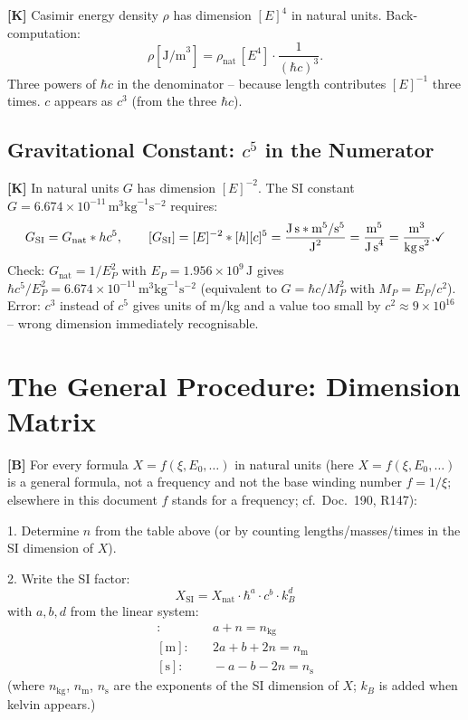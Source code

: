 \textbf{[K]} Casimir energy density $\rho$ has dimension $[E]^4$ in natural
units. Back-computation:
\[
  \rho[\text{J/m}^3]
  = \rho_\text{nat}\,[E^4]\cdot\frac{1}{(\hbar c)^3}.
\]
Three powers of $\hbar c$ in the denominator -- because length contributes
$[E]^{-1}$ three times. $c$ appears as $c^3$ (from the three $\hbar c$).

\subsection{Gravitational Constant: $c^5$ in the Numerator}

\textbf{[K]} In natural units $G$ has dimension $[E]^{-2}$. The SI constant
$G=6{.}674\times10^{-11}\,\text{m}^3\text{kg}^{-1}\text{s}^{-2}$ requires:
\[
  G_\text{SI} = G_\text{nat}\cdot\hbar c^5,
  \qquad
  [G_\text{SI}] = [E]^{-2}\cdot[\hbar][c]^5
  = \frac{\text{J\,s}\cdot\text{m}^5/\text{s}^5}{\text{J}^2}
  = \frac{\text{m}^5}{\text{J\,s}^4}
  = \frac{\text{m}^3}{\text{kg\,s}^2}.\checkmark
\]
Check: $G_\text{nat}=1/E_P^2$ with $E_P=1{.}956\times10^9\,\text{J}$ gives
$\hbar c^5/E_P^2=6{.}674\times10^{-11}\,\text{m}^3\text{kg}^{-1}\text{s}^{-2}$
(equivalent to $G=\hbar c/M_P^2$ with $M_P=E_P/c^2$).
Error: $c^3$ instead of $c^5$ gives units of m/kg and a value too small by
$c^2\approx9\times10^{16}$ -- wrong dimension immediately recognisable.

\section{The General Procedure: Dimension Matrix}

\textbf{[B]} For every formula $X=f(\xi,E_0,\ldots)$ in natural units (here $X = f(\xi, E_0, \ldots)$ is a general formula, not a frequency and not the base winding number $f = 1/\xi$; elsewhere in this document $f$ stands for a frequency; cf.\ Doc.~190, R147):

1. Determine $n$ from the table above (or by counting lengths/masses/times in
   the SI dimension of $X$).

2. Write the SI factor:
\[
  X_\text{SI} = X_\text{nat}\cdot\hbar^a\cdot c^b\cdot k_B^d
\]
with $a,b,d$ from the linear system:
\begin{align*}
  [\text{kg}]:&\quad a+n = n_\text{kg} \\
  [\text{m}]:&\quad 2a+b+2n = n_\text{m} \\
  [\text{s}]:&\quad -a-b-2n = n_\text{s}
\end{align*}
(where $n_\text{kg}$, $n_\text{m}$, $n_\text{s}$ are the exponents of the SI
dimension of $X$; $k_B$ is added when kelvin appears.)

